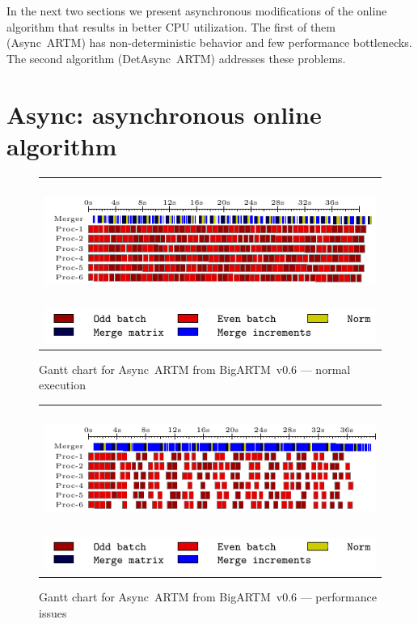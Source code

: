 \documentclass[russian,english]{llncs}
\newcommand{\kw}[1]{\mbox{\textsf{#1}}}
\begin{document}
In the next two sections we present asynchronous modifications of the online algorithm that results in better CPU utilization.
The first of them (\kw{Async~ARTM}) has non-deterministic behavior and few performance bottlenecks.
The second algorithm (\kw{DetAsync~ARTM}) addresses these problems.

\section{Async: asynchronous online algorithm}
\label{sec:AsyncARTM}

\begin{figure}[h]
	\centering
	\begin{tabular}{c}
		\includegraphics[height=4cm, width=12cm]{plots/old.pdf} \\
		\includegraphics[scale=1]{plots/legend_old.pdf}
	\end{tabular}
	\caption{Gantt chart for \kw{Async ARTM} from \kw{BigARTM v0.6} --- normal execution} \label{fig:gantt:AsyncARTM}
\end{figure}

\begin{figure}[h]
	\centering
	\begin{tabular}{c}
		\includegraphics[height=4cm, width=12cm]{plots/old_slow.pdf} \\
		\includegraphics[scale=1]{plots/legend_old.pdf}
	\end{tabular}
	\caption{Gantt chart for \kw{Async ARTM} from \kw{BigARTM v0.6} --- performance issues} \label{fig:gantt:AsyncARTM:slow}
\end{figure}
\end{document}
